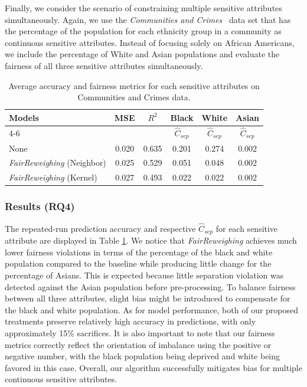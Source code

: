 Finally, we consider the scenario of constraining multiple sensitive attributes simultaneously. Again, we use the \emph{Communities and Crimes}~\cite{redmond2002data} data set that has the percentage of the population for each ethnicity group in a community as continuous sensitive attributes. Instead of focusing solely on African Americans, we include the percentage of White and Asian populations and evaluate the fairness of all three sensitive attributes simultaneously.

\begin{table}[ht]
  \setlength\extrarowheight{2pt}
  \caption{Average accuracy and fairness metrics for each sensitive attributes on Communities and Crimes data.}
  \label{tab:multiple}
    \begin{center}

  \begin{tabular}{l|c|c|c|c|c}
  \hline \multirow{2}{*}{Models} & \multirow{2}{*}{MSE} & \multirow{2}{*}{$R^2$} & Black & White & Asian \\ \cline{4-6}
  
  & & &  $\hat{C}_{sep}$ & $\hat{C}_{sep}$ & $\hat{C}_{sep}$ \\ \hline
  
  {None} & 0.020 & 0.635  & 0.201  & 0.274  & 0.002    \\
  
  {\emph{FairReweighing}} (Neighbor) & 0.025 & 0.529  & 0.051 & 0.048 & 0.002  \\
  
  {\emph{FairReweighing}} (Kernel) & 0.027 & 0.493 & 0.022  & 0.022  & 0.002 \\ \hline
  \end{tabular}
  \end{center}
\end{table}

\subsubsection{Results (\textbf{RQ4})} The repeated-run prediction accuracy and respective $\hat{C}_{sep}$ for each sensitive attribute are displayed in Table \ref{tab:multiple}. We notice that \emph{FairReweighing} achieves much lower fairness violations in terms of the percentage of the black and white population compared to the baseline while producing little change for the percentage of Asians. This is expected because little separation violation was detected against the Asian population before pre-processing. To balance fairness between all three attributes, slight bias might be introduced to compensate for the black and white population. As for model performance, both of our proposed treatments preserve relatively high accuracy in predictions, with only approximately 15\% sacrifices. 
It is also important to note that our fairness metrics correctly reflect the orientation of imbalance using the positive or negative number, with the black population being deprived and white being favored in this case. Overall, our algorithm successfully mitigates bias for multiple continuous sensitive attributes. 


